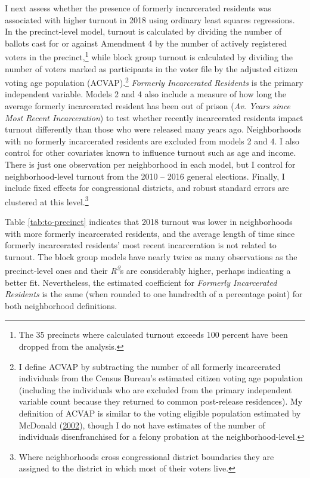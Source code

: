 \documentclass[
  12pt,
]{article}
\begin{document}
I next assess whether the presence of formerly incarcerated residents was associated with higher turnout in 2018 using ordinary least squares regressions. In the precinct-level model, turnout is calculated by dividing the number of ballots cast for or against Amendment 4 by the number of actively registered voters in the precinct,\footnote{The 35 precincts where calculated turnout exceeds 100 percent have been dropped from the analysis.} while block group turnout is calculated by dividing the number of voters marked as participants in the voter file by the adjusted citizen voting age population (ACVAP).\footnote{I define ACVAP by subtracting the number of all formerly incarcerated individuals from the Census Bureau's estimated citizen voting age population (including the individuals who are excluded from the primary independent variable count because they returned to common post-release residences). My definition of ACVAP is similar to the voting eligible population estimated by McDonald (\protect\hyperlink{ref-McDonald2002}{2002}), though I do not have estimates of the number of individuals disenfranchised for a felony probation at the neighborhood-level.} \emph{Formerly Incarcerated Residents} is the primary independent variable. Models 2 and 4 also include a measure of how long the average formerly incarcerated resident has been out of prison (\emph{Av. Years since Most Recent Incarceration}) to test whether recently incarcerated residents impact turnout differently than those who were released many years ago. Neighborhoods with no formerly incarcerated residents are excluded from models 2 and 4. I also control for other covariates known to influence turnout such as age and income. There is just one observation per neighborhood in each model, but I control for neighborhood-level turnout from the 2010 -- 2016 general elections. Finally, I include fixed effects for congressional districts, and robust standard errors are clustered at this level.\footnote{Where neighborhoods cross congressional district boundaries they are assigned to the district in which most of their voters live.}

\begin{singlespace}


\end{singlespace}

Table \ref{tab:to-precinct} indicates that 2018 turnout was lower in neighborhoods with more formerly incarcerated residents, and the average length of time since formerly incarcerated residents' most recent incarceration is not related to turnout. The block group models have nearly twice as many observations as the precinct-level ones and their \emph{R\textsuperscript{2}}s are considerably higher, perhaps indicating a better fit. Nevertheless, the estimated coefficient for \emph{Formerly Incarcerated Residents} is the same (when rounded to one hundredth of a percentage point) for both neighborhood definitions.
\end{document}
